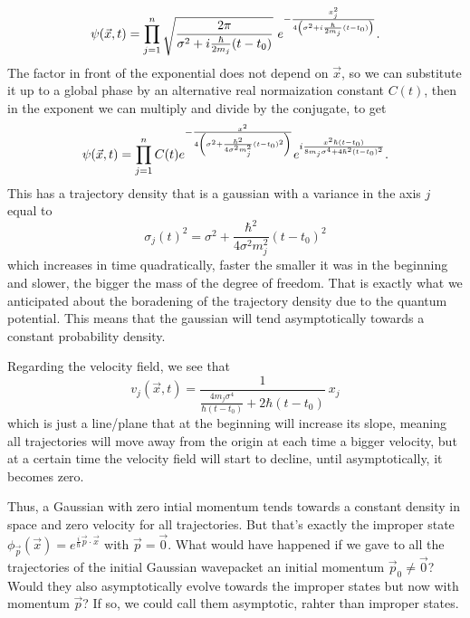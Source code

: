 \documentclass[11pt, a4paper]{article} %
\begin{document}
\begin{equation}
\psi(\vec{x},t)=\prod_{j=1}^n \sqrt{\frac{2\pi}{\sigma^2+i\frac{\hbar}{2m_j}(t-t_0)}}\ e^{-\frac{x_j^2}{4\qty(\sigma^2+i\frac{\hbar}{2m_j}(t-t_0))}}.
\end{equation}
The factor in front of the exponential does not depend on $\vec{x}$, so we can substitute it up to a global phase by an alternative real normaization constant $C(t)$, then in the exponent we can multiply and divide by the conjugate, to get
\begin{equation}
\psi(\vec{x},t)=\prod_{j=1}^n C(t)e^{-\frac{x^2}{4\qty(\sigma^2+\frac{\hbar^2}{4\sigma^2m_j^2}(t-t_0)^2)}}e^{i\frac{x^2\hbar(t-t_0)}{8m_j\sigma^4+4\hbar^2(t-t_0)^2}}.
\end{equation}
This has a trajectory density that is a gaussian with a variance in the axis $j$ equal to
\begin{equation}
\sigma_j(t)^2=\sigma^2+\frac{\hbar^2}{4\sigma^2m_j^2}(t-t_0)^2
\end{equation}
which increases in time quadratically, faster the smaller it was in the beginning and slower, the bigger the mass of the degree of freedom. That is exactly what we anticipated about the boradening of the trajectory density due to the quantum potential. This means that the gaussian will tend asymptotically towards a constant probability density. 

Regarding the velocity field, we see that
\begin{equation}
v_j(\vec{x},t)=\frac{1}{\frac{4m_j\sigma^4}{\hbar(t-t_0)}+2\hbar(t-t_0)}\ x_j
\end{equation}
which is just a line/plane that at the beginning will increase its slope, meaning all trajectories will move away from the origin at each time a bigger velocity, but at a certain time the velocity field will start to decline, until asymptotically, it becomes zero.

Thus, a Gaussian with zero intial momentum tends towards a constant density in space and zero velocity for all trajectories. But that's exactly the improper state $\phi_{\vec{p}}(\vec{x})=e^{\frac{i}{\hbar}\vec{p}\cdot\vec{x}}$ with $\vec{p}=\vec{0}$. What would have happened if we gave to all the trajectories of the initial Gaussian wavepacket an initial momentum $\vec{p}_0\neq\vec{0}$? Would they also asymptotically evolve towards the improper states but now with momentum $\vec{p}$? If so, we could call them asymptotic, rahter than improper states.
\end{document}
